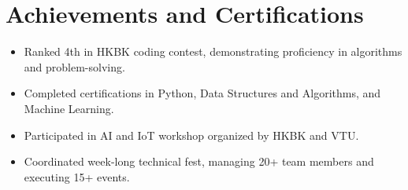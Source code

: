 \documentclass[letterpaper,11pt]{article}
\newcommand{\resumeItem}[1]{
  \item\small{
    {#1 \vspace{-2pt}}
  }
}
\newcommand{\resumeItemListStart}{\begin{itemize}}
\newcommand{\resumeItemListEnd}{\end{itemize}\vspace{-5pt}}
\begin{document}
\section{Achievements and Certifications}
\resumeItemListStart
  \resumeItem{Ranked 4th in HKBK coding contest, demonstrating proficiency in algorithms and problem-solving.}
  \resumeItem{Completed certifications in Python, Data Structures and Algorithms, and Machine Learning.}
  \resumeItem{Participated in AI and IoT workshop organized by HKBK and VTU.}
  \resumeItem{Coordinated week-long technical fest, managing 20+ team members and executing 15+ events.}
\resumeItemListEnd
\end{document}
